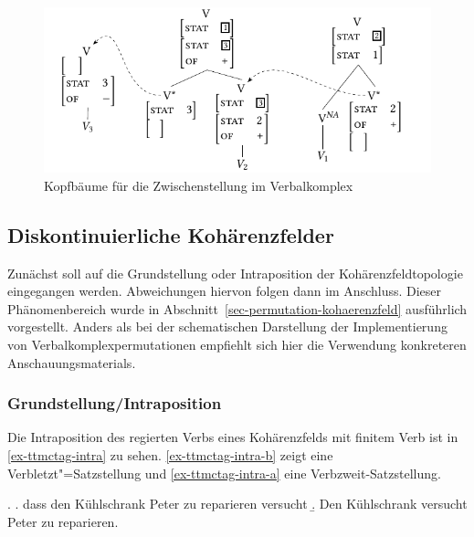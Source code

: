 \begin{figure}[t]
\centering
\includegraphics{graphics/abb712.pdf}
\caption{\label{fig-ttmctag-zwisch}Kopfbäume für die Zwischenstellung im Verbalkomplex}
\end{figure}




\subsection{Diskontinuierliche Kohärenzfelder}\label{sec-ttmctag-permutation}

Zunächst soll auf die Grundstellung oder Intraposition der Kohärenzfeldtopologie eingegangen werden. Abweichungen hiervon folgen dann im Anschluss. Dieser Phänomenbereich wurde in Abschnitt~\ref{sec-permutation-kohaerenzfeld} ausführlich vorgestellt. Anders als bei der schematischen Darstellung der Implementierung von Verbalkomplexpermutationen empfiehlt sich hier die Verwendung konkreteren Anschauungsmaterials.

\subsubsection{Grundstellung/Intraposition}

Die Intraposition des regierten Verbs eines Kohärenzfelds mit finitem Verb ist in \ref{ex-ttmctag-intra} zu sehen. \ref{ex-ttmctag-intra-b} zeigt eine Verbletzt"=Satzstellung und \ref{ex-ttmctag-intra-a} eine Verbzweit-Satzstellung.

\ex. \label{ex-ttmctag-intra}
\a. dass den Kühlschrank Peter zu reparieren versucht \label{ex-ttmctag-intra-b}
\b. Den Kühlschrank versucht Peter zu reparieren. \label{ex-ttmctag-intra-a}

